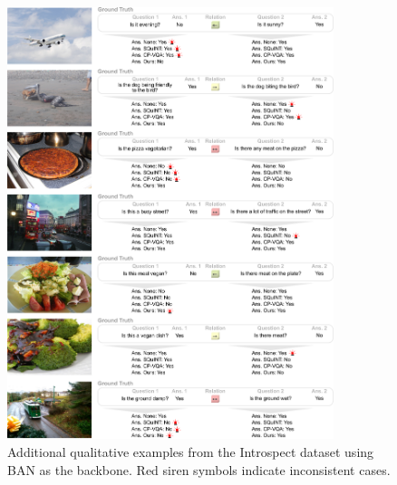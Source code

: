 \begin{figure}[!t]
\centering
\includegraphics[width=0.85\textwidth]{Figures/Part2_Consist/02_logic/examples_ban_supplementary2.pdf}
\caption{Additional qualitative examples from the Introspect dataset using BAN as the backbone. Red siren symbols indicate inconsistent cases.}
\label{fig:examples_introspect2}
\end{figure}

